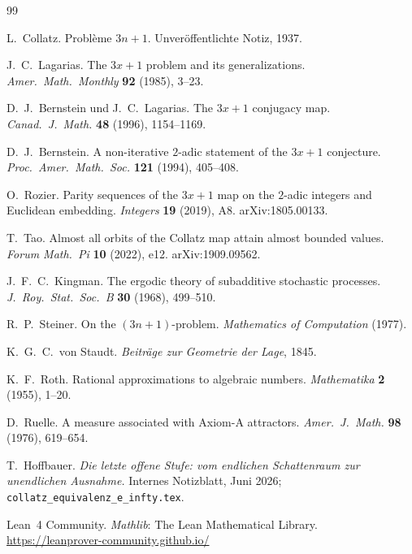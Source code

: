 \documentclass[12pt,a4paper]{article}
\begin{document}
\begin{thebibliography}{99}

L.~Collatz.
Problème $3n+1$.
Unveröffentlichte Notiz, 1937.

J.~C.~Lagarias.
The $3x+1$ problem and its generalizations.
\textit{Amer.\ Math.\ Monthly} \textbf{92} (1985), 3--23.

D.~J.~Bernstein und J.~C.~Lagarias.
The $3x+1$ conjugacy map.
\textit{Canad.\ J.\ Math.} \textbf{48} (1996), 1154--1169.

D.~J.~Bernstein.
A non-iterative $2$-adic statement of the $3x+1$ conjecture.
\textit{Proc.\ Amer.\ Math.\ Soc.} \textbf{121} (1994), 405--408.

O.~Rozier.
Parity sequences of the $3x+1$ map on the $2$-adic integers and Euclidean embedding.
\textit{Integers} \textbf{19} (2019), A8.
arXiv:1805.00133.

T.~Tao.
Almost all orbits of the Collatz map attain almost bounded values.
\textit{Forum Math.\ Pi} \textbf{10} (2022), e12.
arXiv:1909.09562.

J.~F.~C.~Kingman.
The ergodic theory of subadditive stochastic processes.
\textit{J.\ Roy.\ Stat.\ Soc.\ B} \textbf{30} (1968), 499--510.

R.~P.~Steiner.
On the $(3n+1)$-problem.
\textit{Mathematics of Computation} (1977).

K.~G.~C.~von Staudt.
\textit{Beiträge zur Geometrie der Lage}, 1845.

K.~F.~Roth.
Rational approximations to algebraic numbers.
\textit{Mathematika} \textbf{2} (1955), 1--20.

D.~Ruelle.
A measure associated with Axiom-A attractors.
\textit{Amer.\ J.\ Math.} \textbf{98} (1976), 619--654.

T.~Hoffbauer.
\emph{Die letzte offene Stufe: vom endlichen Schattenraum zur unendlichen Ausnahme.}
Internes Notizblatt, Juni 2026;
\texttt{collatz\_equivalenz\_e\_infty.tex}.

Lean~4 Community.
\textit{Mathlib}: The Lean Mathematical Library.
\url{https://leanprover-community.github.io/}

\end{thebibliography}
\end{document}
